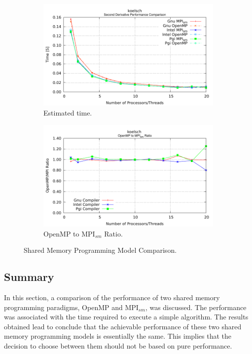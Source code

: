 \begin{figure} [t!]
    \centering
    \captionsetup{justification=centering, singlelinecheck=false}
    \begin{subfigure}{.6\textwidth}
      \centering
      \hspace*{-1.5cm} 
      \includegraphics[width=0.95\linewidth]{Plots/SMPM/koelsch.pdf}
      \caption[]{Estimated time.}
      \label{fig:sharedMemoryComparison3}
    \end{subfigure}%
    \begin{subfigure}{.6\textwidth}
      \centering
      \hspace*{-1.5cm} 
      \includegraphics[width=0.95\linewidth]{Plots/SMPM/koelschRatio.pdf}
      \caption{OpenMP to MPI$_{sm}$ Ratio.}
      \label{fig:sharedMemoryRatioComparison3}
    \end{subfigure}%
\caption{Shared Memory Programming Model Comparison.}
\label{fig:sharedMemoryProgrammingModel3}
\end{figure}


\medskip

\subsection*{Summary}

In this section, a comparison of the performance of two shared memory programming paradigms, OpenMP and MPI$_{sm}$, was discussed. The performance was associated with the time required to execute a simple algorithm. The results obtained lead to conclude that the achievable performance of these two shared memory programming models is essentially the same. This implies that the decision to choose between them should not be based on pure performance.



